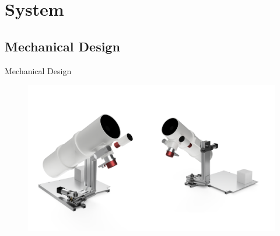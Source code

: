 \documentclass[11pt, aspectratio=169]{beamer}
\begin{document}
\section{System}
\subsection{Mechanical Design}
\begin{frame}[c]{Mechanical Design}
    \begin{figure}
        \includegraphics[height=1\textheight]{mechanical/mech_1.png}
    \end{figure}
\end{frame}
\end{document}
